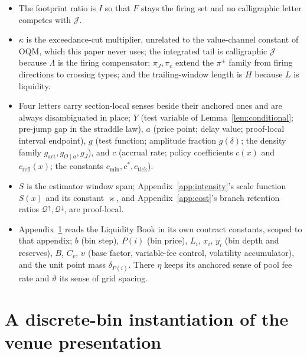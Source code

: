 \documentclass[11pt,a4paper]{article}
\theoremstyle{definition}
\theoremstyle{plain}
\theoremstyle{remark}
\newcommand{\jtail}{\mathcal{J}}
\begin{document}
\begin{itemize}[leftmargin=1.4em, itemsep=0pt, topsep=2pt, parsep=0pt]
$N(0, \cdot)$ of Appendix~\ref{app:proofs} and the proof-local
numerator $N$ of Appendix~\ref{app:floors} are the two scoped
exceptions.
\item The footprint ratio is $I$ so that $F$ stays the firing set
and no calligraphic letter competes with $\jtail$.
\item $\kappa$ is the exceedance-cut multiplier, unrelated to the
value-channel constant of OQM, which this paper never uses; the
integrated tail is calligraphic $\jtail$ because $\Lambda$ is the
firing compensator; $\pi_J, \pi_c$ extend the $\pi^{\pm}$ family
from firing directions to crossing types; and the trailing-window
length is $H$ because $L$ is liquidity.
\item Four letters carry section-local senses beside their
anchored ones and are always disambiguated in place; $Y$ (test
variable of Lemma~\ref{lem:conditional}; pre-jump gap in the
straddle law), $a$ (price point; delay value; proof-local interval
endpoint), $g$ (test function; amplitude fraction $g(\delta)$; the
density family $g_{\mathrm{act}}, g_{O\mid a}, g_J$), and $c$
(accrual rate; policy coefficients $c(x)$ and
$c_{\mathrm{refl}}(x)$; the constants $c_{\min},
c^*, c_{\mathrm{tick}}$).
\item $S$ is the estimator window span;
Appendix~\ref{app:intensity}'s scale function $S(x)$ and its
constant $\varkappa$, and Appendix~\ref{app:cost}'s branch
retention ratios $\mathcal{Q}^{\uparrow}, \mathcal{Q}^{\downarrow}$, are proof-local.
\item Appendix~\ref{app:lb} reads the Liquidity Book in its own
contract constants, scoped to that appendix; $b$ (bin step), $P(i)$
(bin price), $L_i$, $x_i$, $y_i$ (bin depth and reserves), $B$,
$C_v$, $\upsilon$ (base factor, variable-fee control, volatility
accumulator), and the unit point mass $\delta_{P(i)}$. There $\eta$
keeps its anchored sense of pool fee rate and $\vartheta$ its sense
of grid spacing.
\end{itemize}
\endgroup


\section{A discrete-bin instantiation of the venue presentation}\label{app:lb}
\end{document}
